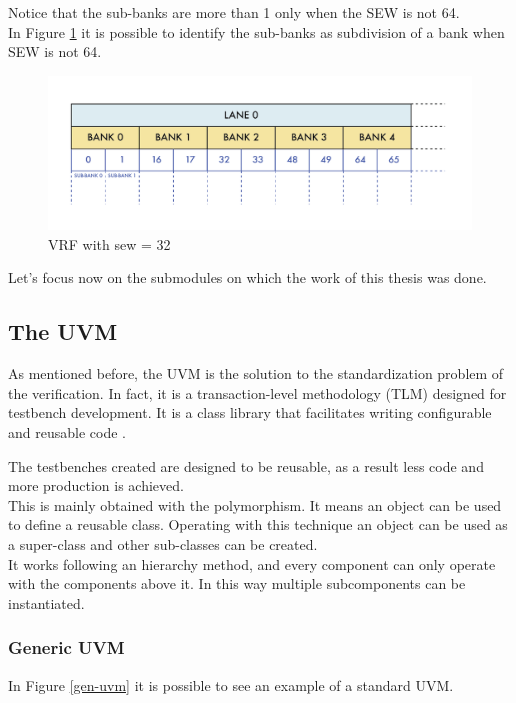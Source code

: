 Notice that the sub-banks are more than 1 only when the SEW is not 64. \\

In Figure \ref{vrf-32} it is possible to identify the sub-banks as subdivision of a bank when SEW is not 64.
\begin{figure}[H]
    \centering
    \includegraphics[scale = 0.7]{Chapter_1/img/vrf-32.png}
    \caption{VRF with sew = 32}
    \label{vrf-32}
\end{figure}

Let's focus now on the submodules on which the work of this thesis was done.




\subsection{The UVM}
As mentioned before, the UVM is the solution to the standardization problem of the verification. In fact, it is a transaction-level methodology (TLM) designed for testbench development. It is a class library that facilitates writing configurable and reusable code \cite{verification-book-2018}.

The testbenches created are designed to be reusable, as a result less code and more production is achieved.\\

This is mainly obtained with the polymorphism. It means an object can be used to define a reusable class. Operating with this technique an object can be used as a super-class and other sub-classes can be created.\\

It works following an hierarchy method, and every component can only operate with the components above it. In this way multiple subcomponents can be instantiated.\\

\subsubsection{Generic UVM}
In Figure \ref{gen-uvm} it is possible to see an example of a standard UVM.


